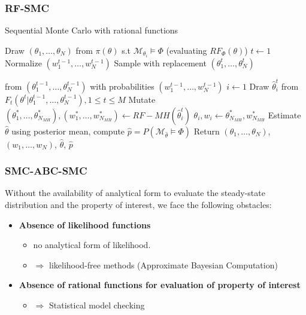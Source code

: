 \documentclass{beamer}
\makeatletter
\def\NoNumber#1{{\def\alglinenumber##1{}\State #1}\addtocounter{ALG@line}{-1}}
\makeatother
\begin{document}
\begin{frame}
    \frametitle{RF-SMC}
    \footnotesize{
        \begin{algorithm}[H]
            \caption{Sequential Monte Carlo with rational functions}
            \label{alg:rf-smc}
            \begin{algorithmic}[1]
                \State Draw $(\theta_1,\ldots,\theta_N)$ from $\pi(\theta)$ s.t $\mathcal{M}_{\theta_i}\models\Phi$ (evaluating $RF_{\Phi}(\theta)$)
                \State $t \leftarrow 1$
                \State Normalize $(w^{t-1}_1,\ldots,w^{t-1}_N)$  
                \State Sample with replacement $(\theta^t_1,\ldots,\theta^t_N)$ 
                \NoNumber{\hspace{.5cm}} from $(\theta^{t-1}_1,\ldots,\theta^{t-1}_N)$ with probabilities $(w^{t-1}_1,\ldots,w^{t-1}_N)$
                \State $i \leftarrow 1$
                 
                \State Draw $\hat{\theta}^t_i$ from $F_t(\theta^t | \theta^{t-1}_1,\ldots,\theta^{t-1}_N), 1\leq t \leq M$
                \State Mutate $(\theta^*_1,\ldots,\theta^*_{N_{MH}}), (w^*_1,\ldots,w^*_{N_{MH}}) \leftarrow RF-MH(\hat{\theta}^t_i)$
                \State $\theta_i, w_i \leftarrow \theta^*_{N_{MH}}, w^*_{N_{MH}}$
                \EndWhile
                \EndWhile
                \State Estimate $\hat{\theta}$ using posterior mean, compute $\hat{p}=P(\mathcal{M}_{\hat{\theta}}\models\Phi)$
                \State Return $(\theta_1,\ldots,\theta_{N})$, $(w_1,\ldots,w_{N})$, $\hat{\theta}$, $\hat{p}$
                \EndProcedure
            \end{algorithmic}
        \end{algorithm}
    }
\end{frame}

\begin{frame}
    \frametitle{SMC-ABC-SMC}
    Without the availability of analytical form to evaluate the steady-state distribution and the property of
    interest, we face the following obstacles:
    \begin{itemize}
        \item \textbf{Absence of likelihood functions}
              \begin{itemize}
                  \item no analytical form of likelihood.
                  \item $\Rightarrow$ likelihood-free methods (Approximate Bayesian Computation)
              \end{itemize}
        \item \textbf{Absence of rational functions for evaluation of property of interest}
              \begin{itemize}
                  \item $\Rightarrow$ Statistical model checking
              \end{itemize}
    \end{itemize}
\end{frame}
\end{document}
